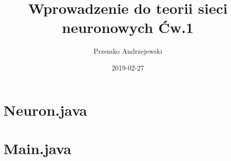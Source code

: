 \documentclass{article}
\title{Wprowadzenie do teorii sieci neuronowych Ćw.1}
\date{2019-02-27}
\author{Przemko Andrzejewski}
\begin{document}
  \maketitle
  \tableofcontents
  \newpage
  \section{Neuron.java}
  
  \newpage
  \section{Main.java}
  
\end{document}
